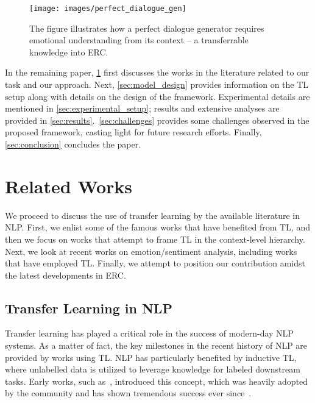 \documentclass[preprint,3pt]{elsarticle}
\begin{document}
\begin{figure}[t]
	\centering
	\texttt{[image: images/perfect\_dialogue\_gen]}
	\caption{\footnotesize{The figure illustrates how a perfect dialogue generator requires emotional understanding from its context -- a transferrable knowledge into ERC.}}
	\label{fig:perfect_dialgoue_gen}
\end{figure}

In the remaining paper, \cref{sec:related_works} first discusses the works in the literature related to our task and our approach. Next, \cref{sec:model_design} provides information on the TL setup along with details on the design of the framework. Experimental details are mentioned in \cref{sec:experimental_setup}; results and extensive analyses are provided in \cref{sec:results}.~\cref{sec:challenges} provides some challenges observed in the proposed framework, casting light for future research efforts. Finally, \cref{sec:conclusion} concludes the paper.







\section{Related Works} \label{sec:related_works}

We proceed to discuss the use of transfer learning by the available literature in NLP. First, we enlist some of the famous works that have benefited from TL, and then we focus on works that attempt to frame TL in the context-level hierarchy. Next, we look at recent works on emotion/sentiment analysis, including works that have employed TL. Finally, we attempt to position our contribution amidst the latest developments in ERC.

\subsection{Transfer Learning in NLP}

Transfer learning has played a critical role in the success of modern-day NLP systems. As a matter of fact, the key milestones in the recent history of NLP are provided by works using TL. NLP has particularly benefited by inductive TL, where unlabelled data is utilized to leverage knowledge for labeled downstream tasks. Early works, such as~\citet{DBLP:journals/jmlr/AndoZ05}, introduced this concept, which was heavily adopted by the community and has shown tremendous success ever since~\cite{DBLP:conf/naacl/RuderPSW19}.
\end{document}
